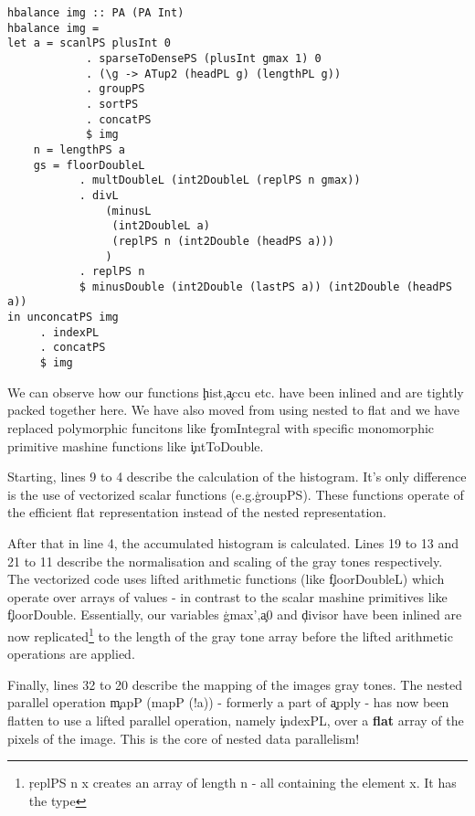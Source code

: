     \begin{lstlisting}
hbalance img :: PA (PA Int)
hbalance img = 
let a = scanlPS plusInt 0
            . sparseToDensePS (plusInt gmax 1) 0
            . (\g -> ATup2 (headPL g) (lengthPL g))
            . groupPS
            . sortPS
            . concatPS
            $ img
    n = lengthPS a
    gs = floorDoubleL
           . multDoubleL (int2DoubleL (replPS n gmax))
           . divL
               (minusL
                (int2DoubleL a)
                (replPS n (int2Double (headPS a)))
               )
           . replPS n
           $ minusDouble (int2Double (lastPS a)) (int2Double (headPS a))
in unconcatPS img
     . indexPL
     . concatPS
     $ img
    \end{lstlisting} %
    We can observe how our functions \c{hist},\c{accu} etc. have been inlined and are tightly packed together here.
    We have also moved from using nested \pan to flat \pav and we have replaced polymorphic funcitons like \c{fromIntegral}
    with specific monomorphic primitive mashine functions like \c{intToDouble}.
    
    Starting, lines 9 to 4 describe the calculation of the histogram.
    It's only difference is the use of vectorized scalar functions (e.g.\c{groupPS}). These functions operate of the efficient flat
    representation instead of the nested representation.
    
    
    After that in line 4, the accumulated histogram is calculated. Lines 19 to 13 and 21 to 11
    describe the normalisation and scaling of the gray tones respectively. The vectorized code uses
    lifted arithmetic functions (like \c{floorDoubleL}) which operate over arrays of values - in contrast to
    the scalar mashine primitives like \c{floorDouble}. Essentially, our variables \c{gmax'},\c{a0} and \c{divisor}
    have been inlined are now replicated\footnote{\c{replPS n x} creates an array of length n - all containing the element x. It has the type }
    to the length of the gray tone array before the lifted arithmetic operations are applied.
    
    
    Finally, lines 32 to 20 describe the mapping of the images gray tones.
    The nested parallel operation \c{mapP (mapP (!a))} - formerly a part of \c{apply} - 
    has now been flatten to use a lifted parallel operation, namely \c{indexPL}, over a \textbf{flat} array of
    the pixels of the image. This is the core of nested data parallelism!
    
